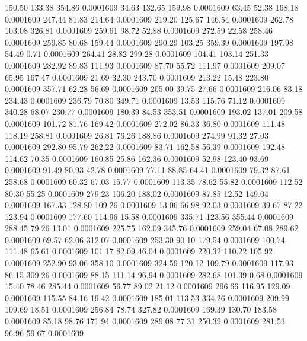  150.50  133.38  354.86   0.0001609
  34.63  132.65  159.98   0.0001609
  63.45   52.38  168.18   0.0001609
 247.44   81.83  214.64   0.0001609
 219.20  125.67  146.54   0.0001609
 262.78  103.08  326.81   0.0001609
 259.61   98.72   52.88   0.0001609
 272.59   22.58  258.46   0.0001609
 259.85   80.68  159.44   0.0001609
 290.29  103.25  359.39   0.0001609
 197.98   54.49    0.71   0.0001609
 264.41   28.82  299.28   0.0001609
 104.41  103.14  251.33   0.0001609
 282.92   89.83  111.93   0.0001609
  87.70   55.72  111.97   0.0001609
 209.07   65.95  167.47   0.0001609
  21.69   32.30  243.70   0.0001609
 213.22   15.48  223.80   0.0001609
 357.71   62.28   56.69   0.0001609
 205.00   39.75   27.66   0.0001609
 216.06   83.18  234.43   0.0001609
 236.79   70.80  349.71   0.0001609
  13.53  115.76   71.12   0.0001609
 340.28   68.07  230.77   0.0001609
 180.39   84.53  353.51   0.0001609
 193.02  137.01  209.58   0.0001609
 101.72   81.76  169.42   0.0001609
 272.02   86.33   36.80   0.0001609
 111.48  118.19  258.81   0.0001609
  26.81   76.26  188.86   0.0001609
 274.99   91.32   27.03   0.0001609
 292.80   95.79  262.22   0.0001609
  83.71  162.58   56.39   0.0001609
 192.48  114.62   70.35   0.0001609
 160.85   25.86  162.36   0.0001609
  52.98  123.40   93.69   0.0001609
  91.49   80.93   42.78   0.0001609
  77.11   88.85   64.41   0.0001609
  79.32   87.61  258.68   0.0001609
  60.32   67.03   15.77   0.0001609
 113.35   78.62   55.82   0.0001609
 112.52   80.30   55.25   0.0001609
 279.23  106.20  188.02   0.0001609
  87.85   12.52  149.04   0.0001609
 167.33  128.80  109.26   0.0001609
  13.06   66.98   92.03   0.0001609
  39.67   87.22  123.94   0.0001609
 177.60  114.96   15.58   0.0001609
 335.71  123.56  355.44   0.0001609
 288.45   79.26   13.01   0.0001609
 225.75  162.09  345.76   0.0001609
 259.04   67.08  289.62   0.0001609
  69.57   62.06  312.07   0.0001609
 253.30   90.10  179.54   0.0001609
 100.74  111.48   65.61   0.0001609
 101.17   82.09   46.04   0.0001609
 220.32  110.22  105.92   0.0001609
 252.90   93.06  358.10   0.0001609
 324.59  120.12  109.79   0.0001609
 117.93   86.15  309.26   0.0001609
  88.15  111.14   96.94   0.0001609
 282.68  101.39    0.68   0.0001609
  15.40   78.46  285.44   0.0001609
  56.77   89.02   21.12   0.0001609
 296.66  116.95  129.09   0.0001609
 115.55   84.16   19.42   0.0001609
 185.01  113.53  334.26   0.0001609
 209.99  109.69   18.51   0.0001609
 256.84   78.74  327.82   0.0001609
 169.39  130.70  183.58   0.0001609
  85.18   98.76  171.94   0.0001609
 289.08   77.31  250.39   0.0001609
 281.53   96.96   59.67   0.0001609
